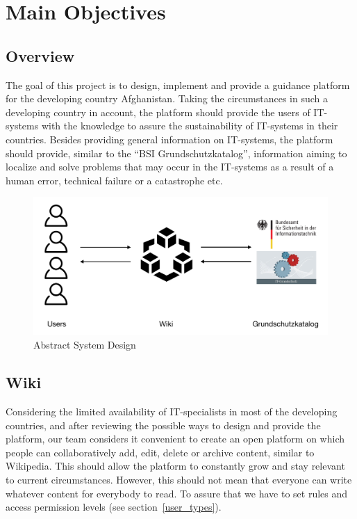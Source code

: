\chapter{Main Objectives}

\section{Overview}
The goal of this project is to design, implement and provide a guidance platform for the developing country Afghanistan. 
Taking the circumstances in such a developing country in account, the platform should provide the users of IT-systems with the knowledge to assure the sustainability of IT-systems in their countries. 
Besides providing general information on IT-systems, the platform should provide, similar to the “BSI Grundschutzkatalog”, information aiming to localize and solve problems that may occur in the IT-systems as a result of a human error, technical failure or a catastrophe etc. 
\\
\begin{figure}[h] 
    \centering
    \includegraphics[scale=0.3]{Pictures/ConceptSketch}
    \caption{Abstract System Design}
\end{figure}


\section{Wiki} 
Considering the limited availability of IT-specialists in most of the developing countries, and after reviewing the possible ways to design and provide the platform, our team considers it convenient to create an open platform on which people can collaboratively add, edit, delete or archive content, similar to Wikipedia. 
This should allow the platform to constantly grow and stay relevant to current circumstances. 
However, this should not mean that everyone can write whatever content for everybody to read. 
To assure that we have to set rules and access permission levels (see section~\ref{user_types}). 

